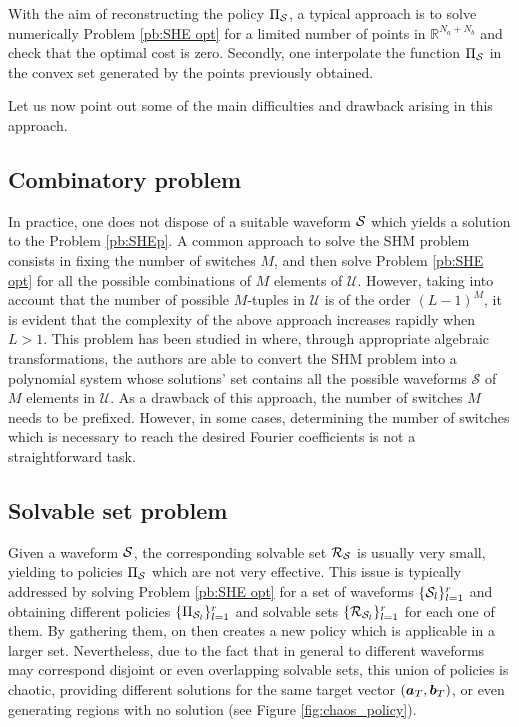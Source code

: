 \documentclass[twocolumn]{autart}    %
\begin{document}
With the aim of reconstructing the policy $\Pi_{\mathcal{S}}$, a typical approach is to solve numerically Problem \ref{pb:SHE opt} for a limited number of points in $\mathbb{R}^{N_a+N_b}$ and check that the optimal cost is zero. Secondly, one interpolate the function $\Pi_{\mathcal{S}}$ in the convex set generated by the points previously obtained. 

Let us now point out some of the main difficulties and drawback arising in this approach.

\subsection{Combinatory problem}\label{subsec:Combinatory Problem}
In practice, one does not dispose of a suitable waveform $\mathcal{S}$ which yields a solution to the Problem \ref{pb:SHEp}. A common approach to solve the SHM problem consists in fixing the number of switches $M$, and then solve Problem \ref{pb:SHE opt} for  all the possible combinations of $M$ elements of $\mathcal{U}$. However, taking into account that the number of possible $M$-tuples  in $\mathcal U$ is of the order $(L-1)^M$, it is evident that the complexity of the above approach increases rapidly when $L>1$. This problem has been studied in \cite{Yang2015} where, through appropriate algebraic transformations, the authors are able to convert the SHM problem into a polynomial system whose solutions' set contains all the possible waveforms $\mathcal S$ of $M$ elements in $\mathcal{U}$. As a drawback of this approach, the number of switches $M$ needs to be prefixed. However, in some cases,  determining the number of switches which is necessary to reach the desired Fourier coefficients is not a straightforward task.

\subsection{Solvable set problem}\label{subsec: resolvable set probem }

Given a waveform $\mathcal{S}$, the corresponding solvable set $\mathcal{R}_{\mathcal{S}}$ is usually very small, yielding to policies $\Pi_{\mathcal{S}}$ which are not very effective. This issue is typically addressed by solving Problem \ref{pb:SHE opt} for a set of waveforms $\{\mathcal{S}_l\}_{l=1}^r$ and obtaining different policies $\{\Pi_{\mathcal{S}_l}\}_{l=1}^r$ and solvable sets $\{\mathcal{R}_{\mathcal{S}_l}\}_{l=1}^r$ for each one of them. By gathering them, on then creates a new policy which is applicable in a larger set. Nevertheless, due to the fact that in general to different waveforms may correspond disjoint or even overlapping solvable sets, this union of policies is chaotic, providing different solutions for the same target vector $(\bm{a}_T,\bm{b}_T)$, or even generating regions with no solution (see Figure \ref{fig:chaos_policy}).
\end{document}

